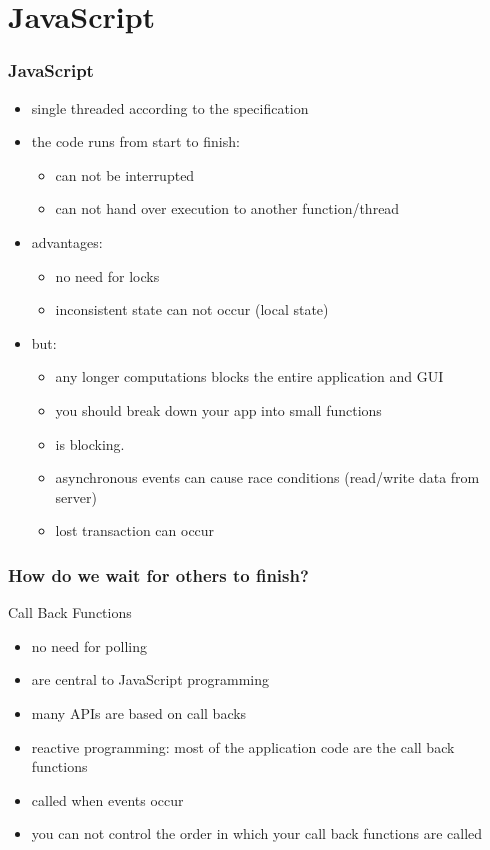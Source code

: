 \section{JavaScript}
\begin{frame}[fragile] \frametitle{JavaScript}
\begin{itemize}
  \item single threaded according to the specification
  \item the code runs from start to finish:
  \begin{itemize}
    \item can not be interrupted
    \item can not hand over execution to another function/thread
  \end{itemize}
  \item advantages:
  \begin{itemize}
    \item no need for locks
    \item inconsistent state can not occur (local state)
  \end{itemize}
  \item but:
  \begin{itemize}
    \item any longer computations blocks the entire application and GUI
    \item you should break down your app into small functions
    \item {} is blocking.
    \item asynchronous events can cause race conditions (read/write data from server)
    \item lost transaction can occur
  \end{itemize}
\end{itemize}
\vspace{5mm}
\end{frame}

\begin{frame}[fragile] \frametitle{How do we wait for others to finish?}
Call Back Functions
\begin{itemize}
  \item no need for polling
  \item are central to JavaScript programming
  \item many APIs are based on call backs
  \item reactive programming: most of the application code are the call back functions
  \item called when events occur
  \item you can not control the order in which your call back functions are called
\end{itemize}
\end{frame}

